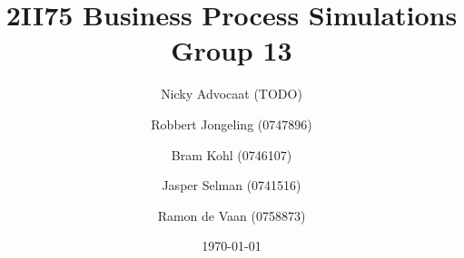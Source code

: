 \documentclass[a4paper,11pt]{article}
\title{
	2II75 Business Process Simulations \\
	\small{Group 13}
}
\author{
	Nicky Advocaat (TODO)
	\and
	Robbert Jongeling (0747896)
	\and
	Bram Kohl (0746107)
	\and
	Jasper Selman (0741516)
	\and
	Ramon de Vaan (0758873)
}
\date{\today}
\begin{document}
	\maketitle
	
	
		
	\newpage
	\begin{appendix}
	
	\end{appendix}
\end{document}
